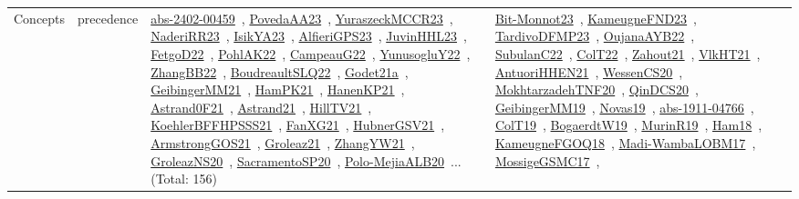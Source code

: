 {\begin{longtable}{lp{3cm}>{\raggedright\arraybackslash}p{6cm}>{\raggedright\arraybackslash}p{6cm}>{\raggedright\arraybackslash}p{8cm}}
Concepts & precedence & \href{works/abs-2402-00459.pdf}{abs-2402-00459}~\cite{abs-2402-00459}, \href{works/PovedaAA23.pdf}{PovedaAA23}~\cite{PovedaAA23}, \href{works/YuraszeckMCCR23.pdf}{YuraszeckMCCR23}~\cite{YuraszeckMCCR23}, \href{works/NaderiRR23.pdf}{NaderiRR23}~\cite{NaderiRR23}, \href{works/IsikYA23.pdf}{IsikYA23}~\cite{IsikYA23}, \href{works/AlfieriGPS23.pdf}{AlfieriGPS23}~\cite{AlfieriGPS23}, \href{works/JuvinHHL23.pdf}{JuvinHHL23}~\cite{JuvinHHL23}, \href{works/FetgoD22.pdf}{FetgoD22}~\cite{FetgoD22}, \href{works/PohlAK22.pdf}{PohlAK22}~\cite{PohlAK22}, \href{works/CampeauG22.pdf}{CampeauG22}~\cite{CampeauG22}, \href{works/YunusogluY22.pdf}{YunusogluY22}~\cite{YunusogluY22}, \href{works/ZhangBB22.pdf}{ZhangBB22}~\cite{ZhangBB22}, \href{works/BoudreaultSLQ22.pdf}{BoudreaultSLQ22}~\cite{BoudreaultSLQ22}, \href{works/Godet21a.pdf}{Godet21a}~\cite{Godet21a}, \href{works/GeibingerMM21.pdf}{GeibingerMM21}~\cite{GeibingerMM21}, \href{works/HamPK21.pdf}{HamPK21}~\cite{HamPK21}, \href{works/HanenKP21.pdf}{HanenKP21}~\cite{HanenKP21}, \href{works/Astrand0F21.pdf}{Astrand0F21}~\cite{Astrand0F21}, \href{works/Astrand21.pdf}{Astrand21}~\cite{Astrand21}, \href{works/HillTV21.pdf}{HillTV21}~\cite{HillTV21}, \href{works/KoehlerBFFHPSSS21.pdf}{KoehlerBFFHPSSS21}~\cite{KoehlerBFFHPSSS21}, \href{works/FanXG21.pdf}{FanXG21}~\cite{FanXG21}, \href{works/HubnerGSV21.pdf}{HubnerGSV21}~\cite{HubnerGSV21}, \href{works/ArmstrongGOS21.pdf}{ArmstrongGOS21}~\cite{ArmstrongGOS21}, \href{works/Groleaz21.pdf}{Groleaz21}~\cite{Groleaz21}, \href{works/ZhangYW21.pdf}{ZhangYW21}~\cite{ZhangYW21}, \href{works/GroleazNS20.pdf}{GroleazNS20}~\cite{GroleazNS20}, \href{works/SacramentoSP20.pdf}{SacramentoSP20}~\cite{SacramentoSP20}, \href{works/Polo-MejiaALB20.pdf}{Polo-MejiaALB20}~\cite{Polo-MejiaALB20}... (Total: 156) & \href{works/Bit-Monnot23.pdf}{Bit-Monnot23}~\cite{Bit-Monnot23}, \href{works/KameugneFND23.pdf}{KameugneFND23}~\cite{KameugneFND23}, \href{works/TardivoDFMP23.pdf}{TardivoDFMP23}~\cite{TardivoDFMP23}, \href{works/OujanaAYB22.pdf}{OujanaAYB22}~\cite{OujanaAYB22}, \href{works/SubulanC22.pdf}{SubulanC22}~\cite{SubulanC22}, \href{works/ColT22.pdf}{ColT22}~\cite{ColT22}, \href{works/Zahout21.pdf}{Zahout21}~\cite{Zahout21}, \href{works/VlkHT21.pdf}{VlkHT21}~\cite{VlkHT21}, \href{works/AntuoriHHEN21.pdf}{AntuoriHHEN21}~\cite{AntuoriHHEN21}, \href{works/WessenCS20.pdf}{WessenCS20}~\cite{WessenCS20}, \href{works/MokhtarzadehTNF20.pdf}{MokhtarzadehTNF20}~\cite{MokhtarzadehTNF20}, \href{works/QinDCS20.pdf}{QinDCS20}~\cite{QinDCS20}, \href{works/GeibingerMM19.pdf}{GeibingerMM19}~\cite{GeibingerMM19}, \href{works/Novas19.pdf}{Novas19}~\cite{Novas19}, \href{works/abs-1911-04766.pdf}{abs-1911-04766}~\cite{abs-1911-04766}, \href{works/ColT19.pdf}{ColT19}~\cite{ColT19}, \href{works/BogaerdtW19.pdf}{BogaerdtW19}~\cite{BogaerdtW19}, \href{works/MurinR19.pdf}{MurinR19}~\cite{MurinR19}, \href{works/Ham18.pdf}{Ham18}~\cite{Ham18}, \href{works/KameugneFGOQ18.pdf}{KameugneFGOQ18}~\cite{KameugneFGOQ18}, \href{works/Madi-WambaLOBM17.pdf}{Madi-WambaLOBM17}~\cite{Madi-WambaLOBM17}, \href{works/MossigeGSMC17.pdf}{MossigeGSMC17}~\cite{MossigeGSMC17}, 
\end{longtable}}
